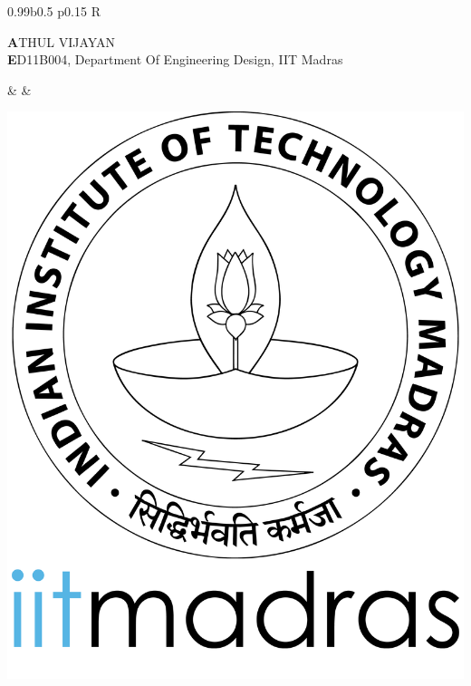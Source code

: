 \documentclass[a4paper,10pt]{article}
\begin{document}

\indent
\begin{tabularx}{0.99\textwidth}{b{} p{} R}
    \specialrule{.05em}{1em}{0em}
    \begin{minipage}{\textwidth}
    \vspace{30pt}
        {\fontsize{16pt}{1em}\selectfont \textbf ATHUL VIJAYAN} \\
        {\large \textbf ED11B004, Department Of Engineering Design, IIT Madras}
    \end{minipage} & &
    \begin{minipage}[l]{.1\textwidth}%
        \vspace{5pt}
        \includegraphics[width=\textwidth]{../iitmlogo.png}
    \end{minipage}\\

    \specialrule{.1em}{.05em}{.05em}
\end{tabularx}
\end{document}
